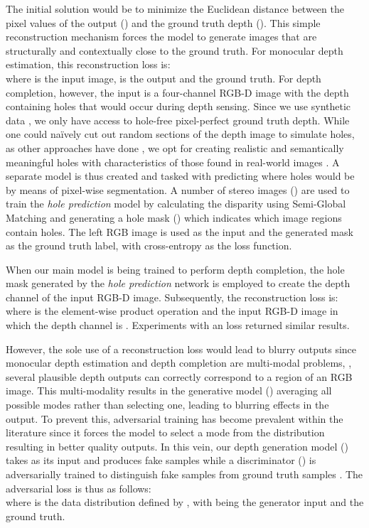 \documentclass[10pt,twocolumn,letterpaper]{article}
\begin{document}
The initial solution would be to minimize the Euclidean distance between the pixel values of the output () and the ground truth depth (). This simple reconstruction mechanism forces the model to generate images that are structurally and contextually close to the ground truth. For monocular depth estimation, this reconstruction loss is:\vspace{-0.15cm}\\
where  is the input image,  is the output and  the ground truth. For depth completion, however, the input  is a four-channel RGB-D image with the depth containing holes that would occur during depth sensing. Since we use synthetic data \cite{RosCVPR16}, we only have access to hole-free pixel-perfect ground truth depth. While one could na\"ively cut out random sections of the depth image to simulate holes, as other approaches have done \cite{pathak2016context, yeh2017semantic}, we opt for creating realistic and semantically meaningful holes with characteristics of those found in real-world images \cite{abarghouei18review}. A separate model is thus created and tasked with predicting where holes would be by means of pixel-wise segmentation. A number of stereo images () \cite{Geiger2013IJRR} are used to train the \textit{hole prediction} model by calculating the disparity using Semi-Global Matching \cite{hirschmuller2008stereo} and generating a hole mask () which indicates which image regions contain holes. The left RGB image is used as the input and the generated mask as the ground truth label, with cross-entropy as the loss function.

When our main model is being trained to perform depth completion, the hole mask generated by the \textit{hole prediction} network is employed to create the depth channel of the input RGB-D image. Subsequently, the reconstruction loss is:\vspace{-0.10cm}
\\
where  is the element-wise product operation and  the input RGB-D image in which the depth channel is . Experiments with an  loss returned similar results.

However, the sole use of a reconstruction loss would lead to blurry outputs since monocular depth estimation and depth completion are multi-modal problems, \ie, several plausible depth outputs can correctly correspond to a region of an RGB image. This multi-modality results in the generative model () averaging all possible modes rather than selecting one, leading to blurring effects in the output. To prevent this, adversarial training \cite{goodfellow2014generative} has become prevalent within the literature \cite{atapour2018real, dosovitskiy2016generating, isola2016image, pathak2016context, yeh2017semantic} since it forces the model to select a mode from the distribution resulting in better quality outputs. In this vein, our depth generation model () takes  as its input and produces fake samples  while a discriminator () is adversarially trained to distinguish fake samples  from ground truth samples . The adversarial loss is thus as follows:\vspace{-0.05cm}\\
where  is the data distribution defined by , with  being the generator input and  the ground truth.
\end{document}
